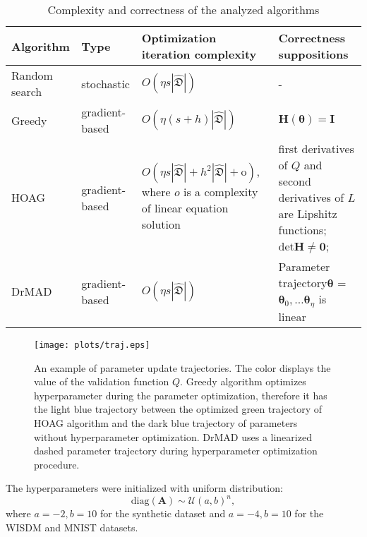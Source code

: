 \documentclass[12pt]{article}
\begin{document}
\begin{table}
\small

\begin{tabularx}{\textwidth}{|X|X|X|X|}
\hline
\bf Algorithm & \bf Type & \bf Optimization iteration complexity & \bf Correctness suppositions  \\ 
\hline
Random search & stochastic & $O(\eta s |\hat{\mathfrak{D}}|)$& -  \\ \hline
Greedy~\cite{hyper_greed} & gradient-based & $O(\eta (s+h) |\hat{\mathfrak{D}}|)$ & $\mathbf{H}(\boldsymbol{\theta}) = \mathbf{I}$  \\ \hline
HOAG~\cite{hyper_hoag} & gradient-based & $O(\eta s |\hat{\mathfrak{D}}| + h^2 |\hat{\mathfrak{D}}| + \text{o}),$ where $o$ is a complexity of linear equation solution& first derivatives of $Q$  and second derivatives of $L$ are Lipshitz functions;  $\text{det}\mathbf{H} \neq \mathbf{0}$;  \\ \hline
DrMAD~\cite{hyper_mad} & gradient-based &$O(\eta s |\hat{\mathfrak{D}}|)$ & Parameter trajectory$\boldsymbol{\theta}$ = $\boldsymbol{\theta}_0, \dots \boldsymbol{\theta}_\eta$  is linear \\ \hline
\end{tabularx}

\caption{Complexity and correctness of the analyzed algorithms}
\label{table:algo_descr}

\end{table}


\begin{figure}[tbh!]
    \centering
    \texttt{[image: plots/traj.eps]}

    \caption{An example of parameter update trajectories. The color displays the value of the validation function $Q$. Greedy algorithm optimizes hyperparameter during the parameter optimization, therefore it has the light blue trajectory between the optimized green trajectory of HOAG algorithm and the dark blue trajectory of parameters without hyperparameter optimization. DrMAD uses a linearized dashed parameter trajectory during hyperparameter optimization procedure.  }
    \end{figure}


The hyperparameters were initialized with uniform distribution:\[
    \text{diag}(\mathbf{A}) \sim \mathcal{U}(a,b)^n,
\]
where $a = -2, b = 10$ for the synthetic dataset and $a = -4, b = 10$  for the WISDM and MNIST datasets.
\end{document}
